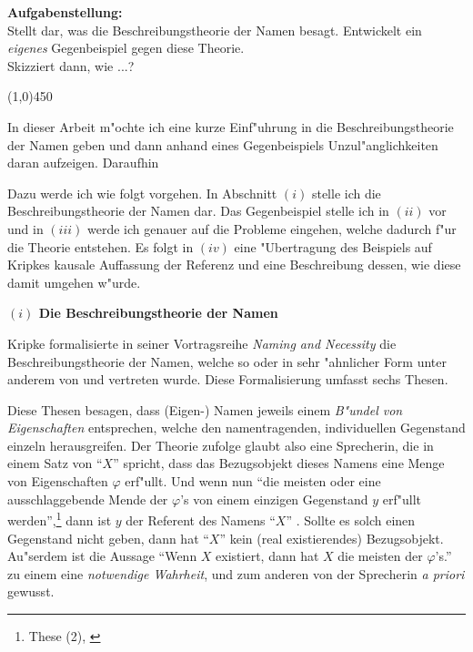 \documentclass[a4paper, emulatestandardclasses, 12pt]{scrartcl}
\begin{document}
\begin{onehalfspace} 

\noindent\textbf{Aufgabenstellung:}\\
Stellt dar, was die Beschreibungstheorie der Namen besagt. Entwickelt ein \emph{eigenes} Gegenbeispiel gegen diese Theorie.\\\indent Skizziert dann, wie ...?
\begin{center}
\vspace{-9pt}\line(1,0){450}
\end{center}


\noindent In dieser Arbeit m"ochte ich eine kurze Einf"uhrung in die Beschreibungstheorie der Namen geben und dann anhand eines Gegenbeispiels Unzul"anglichkeiten daran aufzeigen. Daraufhin 

Dazu werde ich wie folgt vorgehen. In Abschnitt $(i)$ stelle ich die Beschreibungstheorie der Namen dar. Das Gegenbeispiel stelle ich in $(ii)$ vor und in $(iii)$ werde ich genauer auf die Probleme eingehen, welche dadurch f"ur die Theorie entstehen. Es folgt in $(iv)$ eine "Ubertragung des Beispiels auf Kripkes kausale Auffassung der Referenz und eine Beschreibung dessen, wie diese damit umgehen w"urde.
\vspace{5mm}

\noindent\textbf{$(i)$ Die Beschreibungstheorie der Namen}

\noindent Kripke formalisierte in seiner Vortragsreihe \emph{Naming and Necessity} \citep{kripke1972naming}  die Beschreibungstheorie der Namen, welche so oder in sehr "ahnlicher Form unter anderem von \citet{begriffundgegenstand} und \citet{russell1905denoting} vertreten wurde. Diese Formalisierung umfasst sechs Thesen.

Diese Thesen besagen, dass (Eigen-) Namen jeweils einem \emph{B"undel von Eigenschaften} entsprechen, welche den namentragenden, individuellen Gegenstand einzeln herausgreifen. Der Theorie zufolge glaubt also eine Sprecherin, die in einem Satz von "`$X$"' spricht, dass das Bezugsobjekt dieses Namens eine Menge von Eigenschaften $\varphi$ erf"ullt. Und wenn nun  "`die meisten oder eine ausschlaggebende Mende der $\varphi$'s von einem einzigen Gegenstand $y$ erf"ullt werden"',\footnote{These (2), \cite{begriffundgegenstand}} dann ist $y$ der Referent des Namens "`$X$"' . Sollte es solch einen Gegenstand nicht geben, dann hat "`$X$"' kein (real existierendes) Bezugsobjekt. Au"serdem ist die Aussage "`Wenn $X$ existiert, dann hat $X$ die meisten der $\varphi$'s."' zu einem eine \emph{notwendige Wahrheit}, und zum anderen von der Sprecherin \emph{a priori} gewusst.


\end{onehalfspace}
\end{document}
